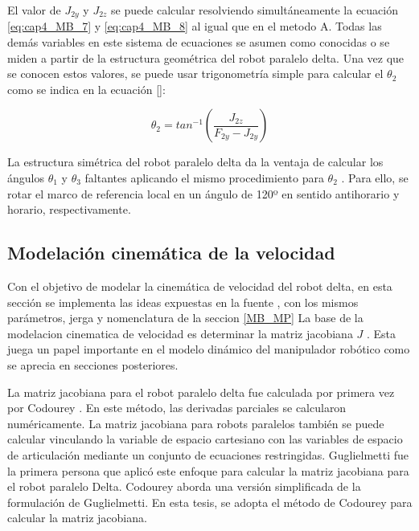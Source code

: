     
        El valor de  \( J_{2y} \)  y  \( J_{2z} \)  se puede calcular resolviendo simultáneamente la ecuación \ref{eq:cap4_MB_7} y \ref{eq:cap4_MB_8} al igual que en el metodo A. Todas las demás variables en este sistema de ecuaciones se asumen como conocidas o se miden a partir de la estructura geométrica del robot paralelo delta. Una vez que se conocen estos valores, se puede usar trigonometría simple para calcular el  \(  \theta _{2} \)  como se indica en la ecuación \ref{}:
        
        \begin{equation} 
            \theta_2=tan^{-1} \left(\frac{J_{2z}}{{F}_{2y}-{J}_{2y}}\right)
        \label{eq:cap4_MB_9}
        \end{equation}  
   
        La estructura simétrica del robot paralelo delta da la ventaja de calcular los ángulos  \(  \theta _{1} \)  y  \(  \theta _{3} \)  faltantes aplicando el mismo procedimiento para  \(  \theta _{2} \) . Para ello, se rotar el marco de referencia local en un ángulo de 120º en sentido antihorario y horario, respectivamente.   
           
     
        \newpage

\subsection{Modelación cinemática de la velocidad}\label{mb_cvel}
    
        Con el objetivo de modelar la cinemática de velocidad del robot delta, en esta sección se implementa las ideas expuestas en la fuente \cite{Path_Planning_and_Trajectory_Optimization},  con los mismos parámetros, jerga y nomenclatura de la seccion  \ref{MB_MP}
        La base de la modelacion cinematica de velocidad es determinar la matriz jacobiana  \( J \) . Esta juega un papel importante en el modelo dinámico del manipulador robótico como se aprecia en secciones posteriores.\par
        
        La matriz jacobiana para el robot paralelo delta fue calculada por primera vez por Codourey \cite{Codourey:31400}. En este método, las derivadas parciales se calcularon numéricamente. La matriz jacobiana para robots paralelos también se puede calcular vinculando la variable de espacio cartesiano con las variables de espacio de articulación mediante un conjunto de ecuaciones restringidas. Guglielmetti \cite{Guglielmetti:31706} fue la primera persona que aplicó este enfoque para calcular la matriz jacobiana para el robot paralelo Delta. Codourey \cite{DynamicCodourey} aborda una versión simplificada de la formulación de Guglielmetti. En esta tesis, se adopta el método de Codourey para calcular la matriz jacobiana.

